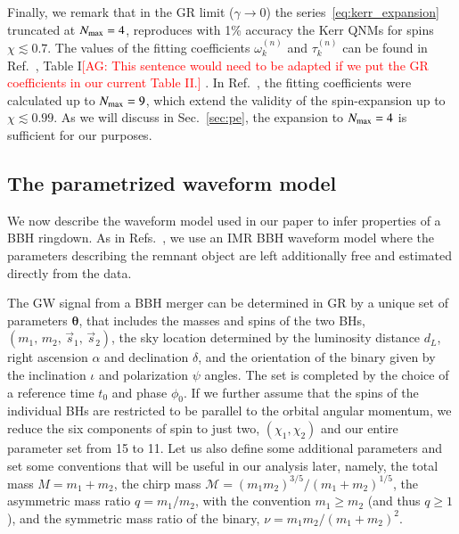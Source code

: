 \documentclass[twocolumn,
               prd,
               aps,
               superscriptaddress,
               tightenlines,
               nofootinbib,
               eqsecnum,
               amsfonts,
               amsmath,
               longbibliography]{revtex4-1}
\newcommand{\agcomm}[1]{{\textcolor{red}{{[AG: #1]}} }}
\begin{document}
Finally, we remark that in the GR limit ($\gamma \to 0$)
the series~\eqref{eq:kerr_expansion} truncated at $N_{\rm max} = 4$, reproduces with 1\% accuracy
the Kerr QNMs for spins $\chi \lesssim 0.7$.
%
The values of the fitting coefficients $\omega_{k}^{(n)}$ and $\tau_{k}^{(n)}$
can be found in Ref.~\cite{Maselli:2019mjd}, Table I\agcomm{This sentence would need
to be adapted if we put the GR coefficients in our current Table II.}.
%
In Ref.~\cite{Carullo:2021dui}, the fitting coefficients were calculated up to $N_{\rm max} = 9$,
which extend the validity of the spin-expansion up to $\chi \lesssim 0.99$.
%
As we will discuss in Sec.~\ref{sec:pe}, the expansion to $N_{\rm max} = 4$ is
sufficient for our purposes.

\subsection{The parametrized waveform model}
\label{sec:review_pSEOB}

We now describe the waveform model used in our paper to infer properties of a
BBH ringdown.
%
As in Refs.~\cite{Brito:2018rfr,Ghosh:2021mrv}, we use an IMR BBH waveform
model where the parameters describing the remnant object are left additionally
free and estimated directly from the data.

The GW signal from a BBH merger can be determined in GR by a unique set of
parameters $\bm{\theta}$, that includes the masses and spins of the two BHs,
$(m_1,\, m_2,\, \vec{s}_1,\, \vec{s}_2)$, the sky location determined by the
luminosity distance $d_L$, right ascension $\alpha$ and declination $\delta$,
and the orientation of the binary given by the inclination $\iota$ and polarization $\psi$
angles.
%
The set is completed by the choice of a reference time $t_0$ and phase
$\phi_0$. If we further assume that the spins of the individual BHs are
restricted to be parallel to the orbital angular momentum, we reduce the six
components of spin to just two, $(\chi_1, \chi_2)$ and our entire parameter set
from 15 to 11.
%
Let us also define some additional parameters and set some conventions that
will be useful in our analysis later, namely, the total mass
%
$M=m_1+m_2$,
%
the chirp mass
%
$\mathcal {M}=(m_{1}m_{2})^{3/5}/(m_{1}+m_{2})^{1/5}$,
%
the asymmetric mass ratio $q=m_1/m_2$, with the convention $m_1 \geqslant m_2$ (and thus $q \geqslant 1$),
and the symmetric mass ratio of the binary, $\nu = m_1m_2/(m_1+m_2)^2$.
\end{document}
